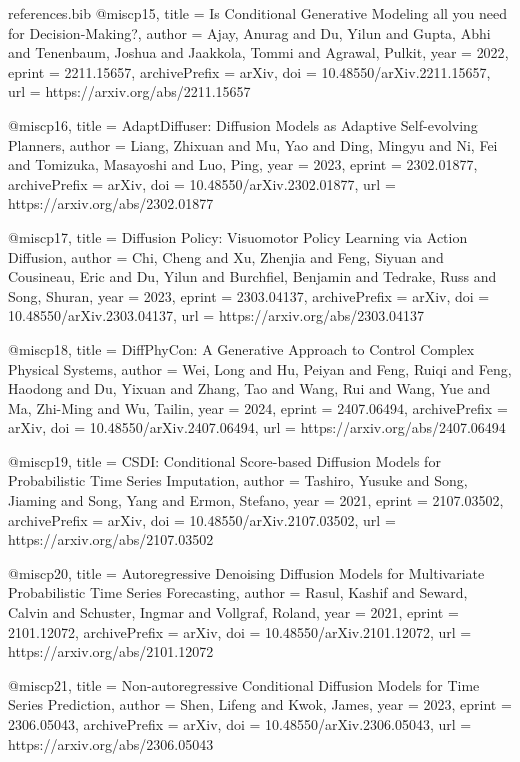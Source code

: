 \begin{filecontents*}{references.bib}
@misc{p15,
  title = {{Is Conditional Generative Modeling all you need for Decision-Making?}},
  author = {Ajay, Anurag and Du, Yilun and Gupta, Abhi and Tenenbaum, Joshua and Jaakkola, Tommi and Agrawal, Pulkit},
  year = {2022},
  eprint = {2211.15657},
  archivePrefix = {arXiv},
  doi = {10.48550/arXiv.2211.15657},
  url = {https://arxiv.org/abs/2211.15657}
}

@misc{p16,
  title = {{AdaptDiffuser: Diffusion Models as Adaptive Self-evolving Planners}},
  author = {Liang, Zhixuan and Mu, Yao and Ding, Mingyu and Ni, Fei and Tomizuka, Masayoshi and Luo, Ping},
  year = {2023},
  eprint = {2302.01877},
  archivePrefix = {arXiv},
  doi = {10.48550/arXiv.2302.01877},
  url = {https://arxiv.org/abs/2302.01877}
}

@misc{p17,
  title = {{Diffusion Policy: Visuomotor Policy Learning via Action Diffusion}},
  author = {Chi, Cheng and Xu, Zhenjia and Feng, Siyuan and Cousineau, Eric and Du, Yilun and Burchfiel, Benjamin and Tedrake, Russ and Song, Shuran},
  year = {2023},
  eprint = {2303.04137},
  archivePrefix = {arXiv},
  doi = {10.48550/arXiv.2303.04137},
  url = {https://arxiv.org/abs/2303.04137}
}

@misc{p18,
  title = {{DiffPhyCon: A Generative Approach to Control Complex Physical Systems}},
  author = {Wei, Long and Hu, Peiyan and Feng, Ruiqi and Feng, Haodong and Du, Yixuan and Zhang, Tao and Wang, Rui and Wang, Yue and Ma, Zhi-Ming and Wu, Tailin},
  year = {2024},
  eprint = {2407.06494},
  archivePrefix = {arXiv},
  doi = {10.48550/arXiv.2407.06494},
  url = {https://arxiv.org/abs/2407.06494}
}

@misc{p19,
  title = {{CSDI: Conditional Score-based Diffusion Models for Probabilistic Time Series Imputation}},
  author = {Tashiro, Yusuke and Song, Jiaming and Song, Yang and Ermon, Stefano},
  year = {2021},
  eprint = {2107.03502},
  archivePrefix = {arXiv},
  doi = {10.48550/arXiv.2107.03502},
  url = {https://arxiv.org/abs/2107.03502}
}

@misc{p20,
  title = {{Autoregressive Denoising Diffusion Models for Multivariate Probabilistic Time Series Forecasting}},
  author = {Rasul, Kashif and Seward, Calvin and Schuster, Ingmar and Vollgraf, Roland},
  year = {2021},
  eprint = {2101.12072},
  archivePrefix = {arXiv},
  doi = {10.48550/arXiv.2101.12072},
  url = {https://arxiv.org/abs/2101.12072}
}

@misc{p21,
  title = {{Non-autoregressive Conditional Diffusion Models for Time Series Prediction}},
  author = {Shen, Lifeng and Kwok, James},
  year = {2023},
  eprint = {2306.05043},
  archivePrefix = {arXiv},
  doi = {10.48550/arXiv.2306.05043},
  url = {https://arxiv.org/abs/2306.05043}
}


\end{filecontents*}
